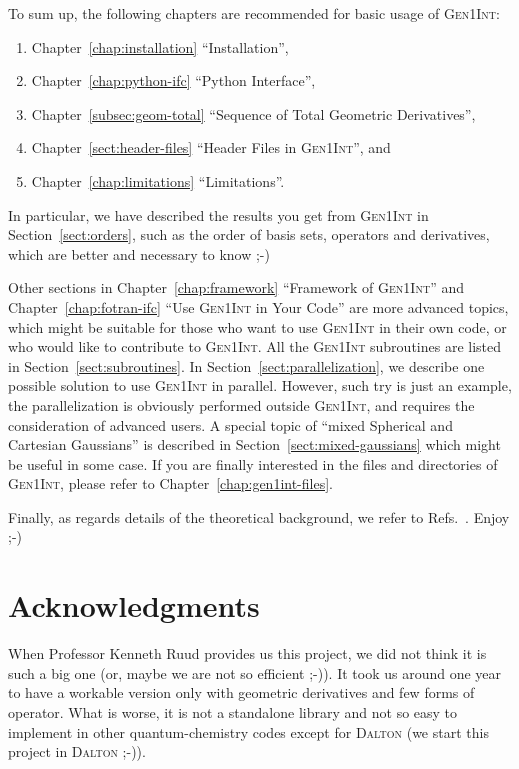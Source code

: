 \documentclass[a4paper,11pt,twoside,openright]{book}
\begin{document}
To sum up, the following chapters are recommended for basic usage of \textsc{Gen1Int}:
\begin{enumerate}
  \item Chapter~\ref{chap:installation} ``Installation'',
  \item Chapter~\ref{chap:python-ifc} ``Python Interface'',
  \item Chapter~\ref{subsec:geom-total} ``Sequence of Total Geometric Derivatives'',
  \item Chapter~\ref{sect:header-files} ``Header Files in \textsc{Gen1Int}'', and
  \item Chapter~\ref{chap:limitations} ``Limitations''.
\end{enumerate}
In particular, we have described the results you get from \textsc{Gen1Int} in Section~\ref{sect:orders},
such as the order of basis sets, operators and derivatives, which are better and necessary to know ;-)

Other sections in Chapter~\ref{chap:framework} ``Framework of \textsc{Gen1Int}'' and Chapter~\ref{chap:fotran-ifc}
``Use \textsc{Gen1Int} in Your Code'' are more advanced topics, which might be suitable for those
who want to use \textsc{Gen1Int} in their own code, or who would like to contribute to \textsc{Gen1Int}.
All the \textsc{Gen1Int} subroutines are listed in Section~\ref{sect:subroutines}. In Section~\ref{sect:parallelization},
we describe one possible solution to use \textsc{Gen1Int} in parallel. However, such try is just an example,
the parallelization is obviously performed outside \textsc{Gen1Int}, and requires the consideration of
advanced users. A special topic of ``mixed Spherical and Cartesian Gaussians'' is described in
Section~\ref{sect:mixed-gaussians} which might be useful in some case. If you are finally interested in
the files and directories of \textsc{Gen1Int}, please refer to Chapter~\ref{chap:gen1int-files}.

Finally, as regards details of the theoretical background, we refer to Refs.~\cite{Gao:IJQC:2010,bgkrth-a,bgkr}.
Enjoy ;-)

\chapter*{Acknowledgments}
\label{chap:acknowledgments}


When Professor Kenneth Ruud provides us this project, we did not think it is such a big one
(or, maybe we are not so efficient ;-)). It took us around one year to have a workable version
only with geometric derivatives and few forms of operator. What is worse, it is not a standalone
library and not so easy to implement in other quantum-chemistry codes except for \textsc{Dalton}
(we start this project in \textsc{Dalton} ;-)).
\end{document}
